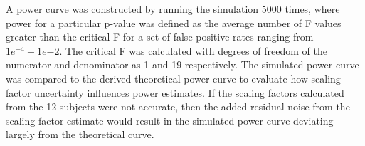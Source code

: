 A power curve was constructed by running the simulation 5000 times, where power for a particular p-value was defined as the average number of F values greater than the critical F for a set of false positive rates ranging from $1e^{-4} - 1e{-2}$. The critical F was calculated with degrees of freedom of the numerator and denominator as 1 and 19 respectively. The simulated power curve was compared to the derived theoretical power curve to evaluate how scaling factor uncertainty influences power estimates. If the scaling factors calculated from the 12 subjects were not accurate, then the added residual noise from the scaling factor estimate would result in the simulated power curve deviating largely from the theoretical curve.